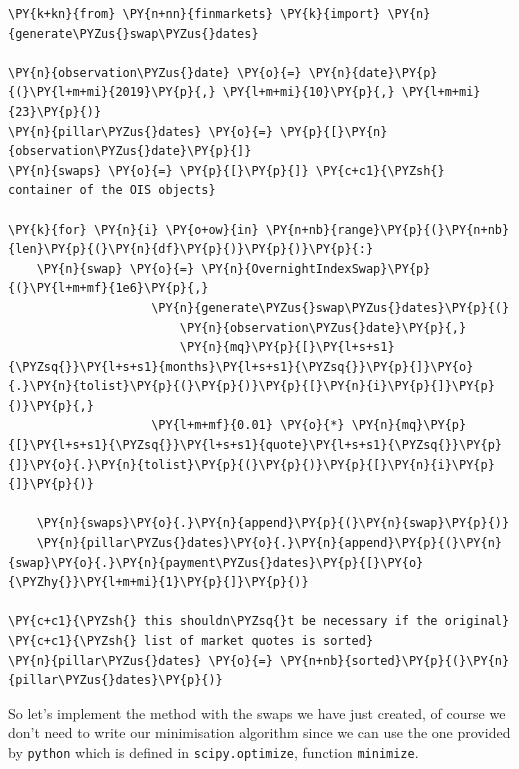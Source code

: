 \begin{tcolorbox}[breakable, size=fbox, boxrule=1pt, pad at break*=1mm,colback=cellbackground, colframe=cellborder]
\begin{Verbatim}[commandchars=\\\{\}]
\PY{k+kn}{from} \PY{n+nn}{finmarkets} \PY{k}{import} \PY{n}{generate\PYZus{}swap\PYZus{}dates}

\PY{n}{observation\PYZus{}date} \PY{o}{=} \PY{n}{date}\PY{p}{(}\PY{l+m+mi}{2019}\PY{p}{,} \PY{l+m+mi}{10}\PY{p}{,} \PY{l+m+mi}{23}\PY{p}{)}
\PY{n}{pillar\PYZus{}dates} \PY{o}{=} \PY{p}{[}\PY{n}{observation\PYZus{}date}\PY{p}{]}
\PY{n}{swaps} \PY{o}{=} \PY{p}{[}\PY{p}{]} \PY{c+c1}{\PYZsh{} container of the OIS objects}

\PY{k}{for} \PY{n}{i} \PY{o+ow}{in} \PY{n+nb}{range}\PY{p}{(}\PY{n+nb}{len}\PY{p}{(}\PY{n}{df}\PY{p}{)}\PY{p}{)}\PY{p}{:}
    \PY{n}{swap} \PY{o}{=} \PY{n}{OvernightIndexSwap}\PY{p}{(}\PY{l+m+mf}{1e6}\PY{p}{,}
                    \PY{n}{generate\PYZus{}swap\PYZus{}dates}\PY{p}{(}
                        \PY{n}{observation\PYZus{}date}\PY{p}{,} 
                        \PY{n}{mq}\PY{p}{[}\PY{l+s+s1}{\PYZsq{}}\PY{l+s+s1}{months}\PY{l+s+s1}{\PYZsq{}}\PY{p}{]}\PY{o}{.}\PY{n}{tolist}\PY{p}{(}\PY{p}{)}\PY{p}{[}\PY{n}{i}\PY{p}{]}\PY{p}{)}\PY{p}{,}
                    \PY{l+m+mf}{0.01} \PY{o}{*} \PY{n}{mq}\PY{p}{[}\PY{l+s+s1}{\PYZsq{}}\PY{l+s+s1}{quote}\PY{l+s+s1}{\PYZsq{}}\PY{p}{]}\PY{o}{.}\PY{n}{tolist}\PY{p}{(}\PY{p}{)}\PY{p}{[}\PY{n}{i}\PY{p}{]}\PY{p}{)}

    \PY{n}{swaps}\PY{o}{.}\PY{n}{append}\PY{p}{(}\PY{n}{swap}\PY{p}{)}
    \PY{n}{pillar\PYZus{}dates}\PY{o}{.}\PY{n}{append}\PY{p}{(}\PY{n}{swap}\PY{o}{.}\PY{n}{payment\PYZus{}dates}\PY{p}{[}\PY{o}{\PYZhy{}}\PY{l+m+mi}{1}\PY{p}{]}\PY{p}{)}

\PY{c+c1}{\PYZsh{} this shouldn\PYZsq{}t be necessary if the original}
\PY{c+c1}{\PYZsh{} list of market quotes is sorted}
\PY{n}{pillar\PYZus{}dates} \PY{o}{=} \PY{n+nb}{sorted}\PY{p}{(}\PY{n}{pillar\PYZus{}dates}\PY{p}{)}
\end{Verbatim}
\end{tcolorbox}

So let's implement the method with the swaps we have just created, of course we don't need to write our minimisation algorithm since we can use the one provided by \texttt{python} which is defined in \texttt{scipy.optimize}, function \texttt{minimize}.

